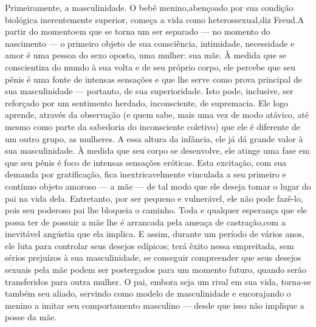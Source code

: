  Primeiramente, a masculinidade. O bebê menino,\idxconfemeni[|(] abençoado por sua
condição biológica inerentemente superior, começa a vida como\idxconfehete{}
heterossexual,\idxheteroconf[|(] diz Freud.\idxfreudedipo[|(] A partir do momento\idxidenedi[|(] em que se torna um ser
separado --- no momento do nascimento --- o primeiro objeto de sua
consciência, intimidade, necessidade e amor é uma pessoa do sexo
oposto, uma mulher: sua mãe. À medida que se conscientiza do mundo à
sua volta e de seu próprio corpo, ele percebe que seu pênis é uma fonte
de intensas sensações e que lhe serve como prova principal de sua
masculinidade --- portanto, de sua superioridade. Isto pode, inclusive,
ser reforçado por um sentimento herdado, inconsciente, de supremacia.
Ele logo aprende, através da observação (e quem sabe, mais uma vez de
modo atávico, até mesmo como parte da sabedoria do inconsciente
coletivo) que ele é diferente de um outro grupo, as mulheres. A essa
altura da infância, ele já dá grande valor à sua masculinidade.
À medida que seu corpo se desenvolve, ele atinge uma fase em que seu pênis
é foco de intensas sensações eróticas. Esta excitação, com sua demanda
por gratificação, fica inextricavelmente vinculada a seu primeiro e
contínuo objeto amoroso --- a mãe --- de tal modo que ele deseja
tomar o lugar do pai na vida dela. Entretanto, por ser pequeno e
vulnerável, ele não pode fazê-lo, pois seu poderoso pai\idxmascupat{} lhe bloqueia o
caminho. Toda e qualquer esperança que ele possa ter de possuir a mãe
lhe é arrancada pela ameaça de castração,\idxcastaconf[|(] com a inevitável angústia que
ela implica. E assim, durante um período de vários anos, ele luta para
controlar seus desejos edípicos; terá êxito nessa empreitada, sem
sérios prejuízos à sua masculinidade,\idxpaismasc{} se conseguir compreender que
seus desejos sexuais pela mãe podem ser postergados para um momento
futuro, quando serão transferidos para outra mulher. O pai, embora
seja um rival em sua vida, torna-se também seu aliado, servindo como
modelo de masculinidade e encorajando o menino a imitar seu
comportamento masculino --- desde que isso não implique a posse\idxconfemeni{} da mãe.

